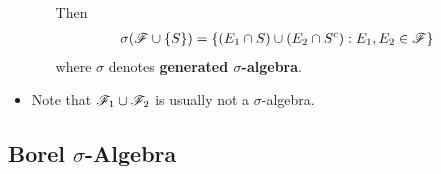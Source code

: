 \documentclass[11pt]{article}
\begin{document}
\begin{itemize}
\begin{example}
\begin{enumerate}
\begin{proposition}
Then \begin{align*}
\sigma({\mathscr F}\cup \left\{S\right\}) &=\left\{(E_{1}\cap S)\cup (E_{2}\cap S^{c}): E_{1},E_{2}\in {\mathscr F}\right\}
\end{align*}
where $\sigma$ denotes \textbf{generated $\sigma$-algebra}.
\end{proposition}
\end{enumerate}

\end{example}

\item \begin{remark}
 Note that ${\mathscr F}_{1}\cup {\mathscr F}_{2}$ is usually not a $\sigma$-algebra.
 \end{remark}
\end{itemize}

\subsection{Borel $\sigma$-Algebra}
\end{document}
